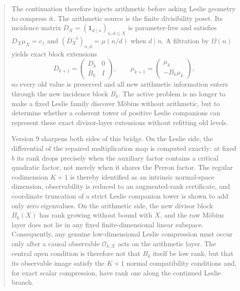 \documentclass[11pt]{amsart}
\numberwithin{equation}{section}
\theoremstyle{plain}
\theoremstyle{definition}
\theoremstyle{remark}
\begin{document}
\begin{abstract}
The continuation therefore injects arithmetic before asking Leslie geometry to compress it.
The arithmetic source is the finite divisibility poset.  Its incidence matrix
$D_X=(\mathbf 1_{d\mid n})_{n,d\le X}$ is parameter-free and satisfies
$D_X\mu_X=e_1$ and $(D_X^{-1})_{n,d}=\mu(n/d)$ when $d\mid n$.  A filtration by
$\Omega(n)$ yields exact block extensions
\[
D_{k+1}=
\begin{pmatrix}D_k&0\\ B_k&I\end{pmatrix},
\qquad
\mu_{k+1}=
\begin{pmatrix}\mu_k\\-B_k\mu_k\end{pmatrix},
\]
so every old value is preserved and all new arithmetic information enters through the new
incidence block $B_k$.  The active problem is no longer to make a fixed Leslie family discover
M\"obius without arithmetic, but to determine whether a coherent tower of positive Leslie
companions can represent these exact divisor-layer extensions without refitting old levels.

Version 9 sharpens both sides of this bridge.  On the Leslie side, the differential of the
repaired multiplication map is computed exactly: at fixed $b$ its rank drops precisely when the
auxiliary factor contains a critical quadratic factor, not merely when it shares the Perron
factor.  The regular codimension $K+1$ is thereby identified as an intrinsic normal-space
dimension, observability is reduced to an augmented-rank certificate, and coordinate truncation
of a strict Leslie companion tower is shown to add only zero eigenvalues.  On the arithmetic
side, the new divisor block $B_k(X)$ has rank growing without bound with $X$, and the raw M\"obius
layer does not lie in any fixed finite-dimensional linear subspace.  Consequently, any genuine
low-dimensional Leslie compression must occur only after a causal observable
$\mathcal O_{k,X}$ acts on the arithmetic layer.  The central open condition is therefore not
that $B_k$ itself be low rank, but that its observable image satisfy the $K+1$ normal
compatibility conditions and, for exact scalar compression, have rank one along the continued
Leslie branch.

\end{abstract}
\maketitle

\tableofcontents
\bigskip
\end{document}
